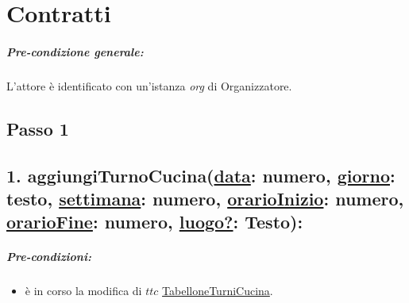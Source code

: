 \chapter{Contratti}
\paragraph{Pre-condizione generale:} L'attore è identificato con un'istanza \textit{org} di Organizzatore.

\section{Passo 1}
\section*{1. aggiungiTurnoCucina(\underline{data}: numero, \underline{giorno}: testo, \underline{settimana}: numero, \underline{orarioInizio}: numero, \underline{orarioFine}: numero, \underline{luogo?}: Testo):}

\paragraph{Pre-condizioni:} 
\begin{itemize}
 \item è in corso la modifica di $ttc$ \underline{TabelloneTurniCucina}.
\end{itemize}

